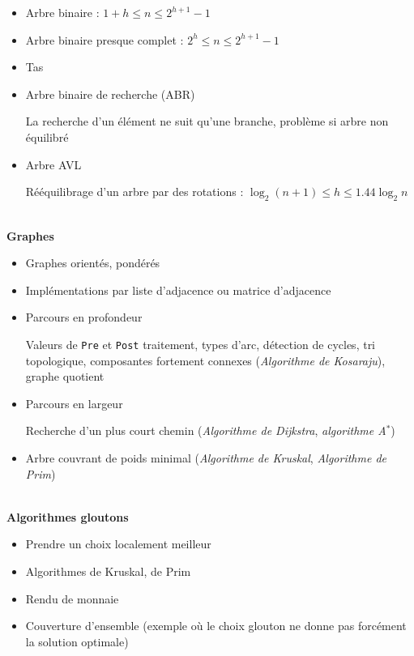 \documentclass[10pt,a4paper]{article}
\newcommand{\cat}[1]{\noindent \textbf{\Large #1}}
\begin{document}
%
\begin{itemize}[noitemsep]
	\item Arbre binaire : \(  1+h \leq n \leq 2^{h+1}-1  \)
	\item Arbre binaire presque complet : %
		\(  2^h \leq n \leq 2^{h+1}-1  \)
	\item Tas
	\item Arbre binaire de recherche (ABR)
	
		La recherche d'un élément ne suit qu'une branche, problème si arbre non équilibré
	\item Arbre AVL
	
		Rééquilibrage d'un arbre par des rotations :
		\(  \log _2(n+1) \leq h \leq 1.44\log _2 n  \)
	
\end{itemize}
%
~ \\


\cat{Graphes}

%
\begin{itemize}[noitemsep]
	\item Graphes orientés, pondérés
	\item Implémentations par liste d'adjacence ou matrice d'adjacence
	\item Parcours en profondeur
	
		Valeurs de \texttt{Pre} et \texttt{Post} traitement, types d'arc, détection de cycles, tri topologique, composantes fortement  connexes (\emph{Algorithme de Kosaraju}), graphe quotient
	\item Parcours en largeur
	
		Recherche d'un plus court chemin (\emph{Algorithme de Dijkstra}, \emph{algorithme A\(^*\)})
	\item Arbre couvrant de poids minimal (\emph{Algorithme de Kruskal}, \emph{Algorithme de Prim})
\end{itemize}
%
~ \\


\cat{Algorithmes gloutons}

\begin{itemize}[noitemsep]
	\item Prendre un choix localement meilleur
	\item Algorithmes de Kruskal, de Prim
	\item Rendu de monnaie
	\item Couverture d'ensemble (exemple où le choix glouton ne donne pas forcément la solution optimale)
\end{itemize}
~ \\
\end{document}
